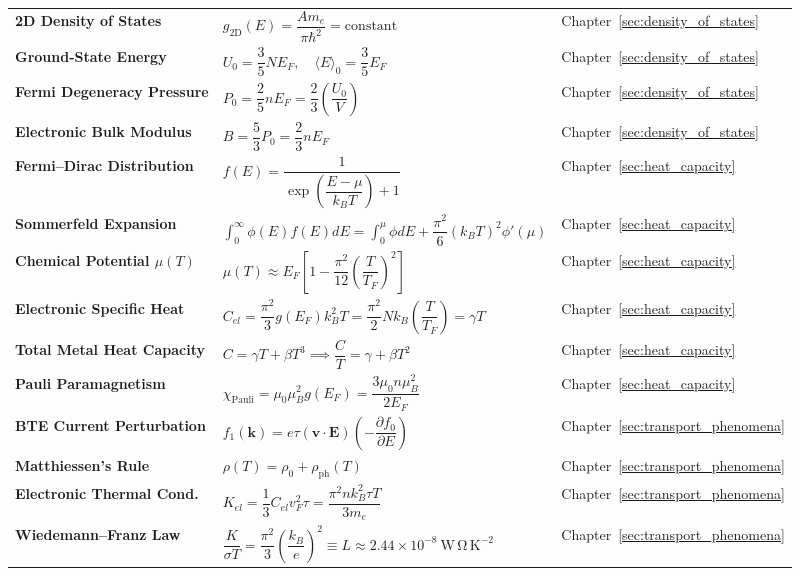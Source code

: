 \documentclass[11pt,a4paper]{article}
\newcommand{\vb}[1]{\mathbf{#1}}
\begin{document}
\begin{longtable}{p{} p{} p{}}
\textbf{2D Density of States} & $g_{\mathrm{2D}}(E) = \dfrac{A m_e}{\pi\hbar^2} = \mathrm{constant}$ & Chapter~\ref{sec:density_of_states} \\
\textbf{Ground-State Energy} & $U_0 = \dfrac{3}{5}N E_F, \quad \langle E \rangle_0 = \dfrac{3}{5}E_F$ & Chapter~\ref{sec:density_of_states} \\
\textbf{Fermi Degeneracy Pressure} & $P_0 = \dfrac{2}{5}n E_F = \dfrac{2}{3}\left(\dfrac{U_0}{V}\right)$ & Chapter~\ref{sec:density_of_states} \\
\textbf{Electronic Bulk Modulus} & $B = \dfrac{5}{3}P_0 = \dfrac{2}{3}n E_F$ & Chapter~\ref{sec:density_of_states} \\
\textbf{Fermi--Dirac Distribution} & $f(E) = \dfrac{1}{\exp\left(\dfrac{E-\mu}{k_BT}\right) + 1}$ & Chapter~\ref{sec:heat_capacity} \\
\textbf{Sommerfeld Expansion} & $\int_0^\infty \phi(E)f(E)dE = \int_0^\mu \phi dE + \dfrac{\pi^2}{6}(k_BT)^2 \phi'(\mu)$ & Chapter~\ref{sec:heat_capacity} \\
\textbf{Chemical Potential $\mu(T)$} & $\mu(T) \approx E_F\left[ 1 - \dfrac{\pi^2}{12}\left(\dfrac{T}{T_F}\right)^2 \right]$ & Chapter~\ref{sec:heat_capacity} \\
\textbf{Electronic Specific Heat} & $C_{el} = \dfrac{\pi^2}{3}g(E_F) k_B^2 T = \dfrac{\pi^2}{2}Nk_B\left(\dfrac{T}{T_F}\right) = \gamma T$ & Chapter~\ref{sec:heat_capacity} \\
\textbf{Total Metal Heat Capacity} & $C = \gamma T + \beta T^3 \implies \dfrac{C}{T} = \gamma + \beta T^2$ & Chapter~\ref{sec:heat_capacity} \\
\textbf{Pauli Paramagnetism} & $\chi_{\mathrm{Pauli}} = \mu_0 \mu_B^2 g(E_F) = \dfrac{3\mu_0 n \mu_B^2}{2E_F}$ & Chapter~\ref{sec:heat_capacity} \\
\textbf{BTE Current Perturbation} & $f_1(\vb{k}) = e\tau(\vb{v}\cdot\vb{E})\left(-\dfrac{\partial f_0}{\partial E}\right)$ & Chapter~\ref{sec:transport_phenomena} \\
\textbf{Matthiessen's Rule} & $\rho(T) = \rho_0 + \rho_{\mathrm{ph}}(T)$ & Chapter~\ref{sec:transport_phenomena} \\
\textbf{Electronic Thermal Cond.} & $K_{el} = \dfrac{1}{3}C_{el}v_F^2\tau = \dfrac{\pi^2 n k_B^2 \tau T}{3m_e}$ & Chapter~\ref{sec:transport_phenomena} \\
\textbf{Wiedemann--Franz Law} & $\dfrac{K}{\sigma T} = \dfrac{\pi^2}{3}\left(\dfrac{k_B}{e}\right)^2 \equiv L \approx 2.44 \times 10^{-8}\ \mathrm{W\,\Omega\,K^{-2}}$ & Chapter~\ref{sec:transport_phenomena} \\

\end{longtable}
\end{document}
